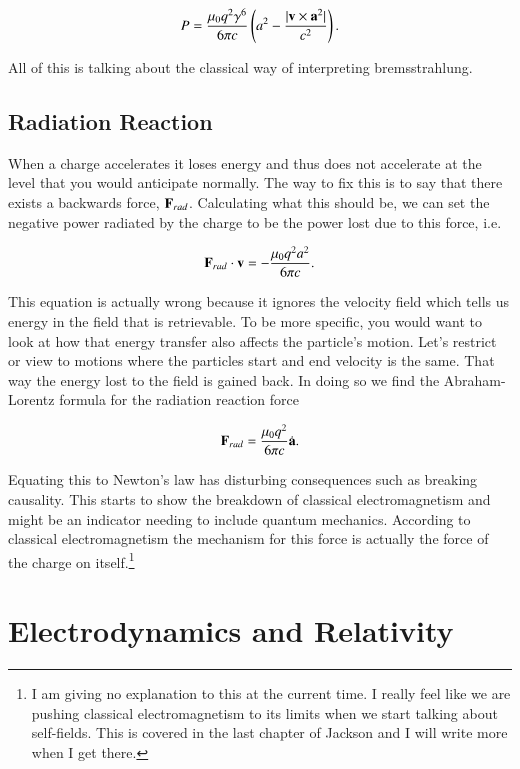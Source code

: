 \documentclass[preprint, review,12pt]{elsarticle}
\def\x{\times}
\def\.{\cdot}
\def\b{\textbf}
\def\9{\left(}
\def\0{\right)}
\begin{document}
\begin{equation}
    P = \frac{\mu_0 q^2 \gamma^6}{6 \pi c} \9 a^2 - \frac{|\b v \x \b a^2|}{c^2} \0.
\end{equation}

All of this is talking about the classical way of interpreting bremsstrahlung. 

\subsection{Radiation Reaction}

When a charge accelerates it loses energy and thus does not accelerate at the level that you would anticipate normally. The way to fix this is to say that there exists a backwards force, $\b F_{rad}$. Calculating what this should be, we can set the negative power radiated by the charge to be the power lost due to this force, i.e.

\begin{equation}
    \b F_{rad} \. \b v = - \frac{\mu_0 q^2 a^2}{6 \pi c}.
\end{equation}
 
This equation is actually wrong because it ignores the velocity field which tells us energy in the field that is retrievable. To be more specific, you would want to look at how that energy transfer also affects the particle's motion. Let's restrict or view to motions where the particles start and end velocity is the same. That way the energy lost to the field is gained back. In doing so we find the Abraham-Lorentz formula for the radiation reaction force

\begin{equation}
    \b F_{rad} = \frac{\mu_0 q^2}{6 \pi c} \dot{\b a}.
\end{equation}

Equating this to Newton's law has disturbing consequences such as breaking causality. This starts to show the breakdown of classical electromagnetism and might be an indicator needing to include quantum mechanics. According to classical electromagnetism the mechanism for this force is actually the force of the charge on itself.\footnote{I am giving no explanation to this at the current time. I really feel like we are pushing classical electromagnetism to its limits when we start talking about self-fields. This is covered in the last chapter of Jackson and I will write more when I get there.}

\section{Electrodynamics and Relativity}
\end{document}
